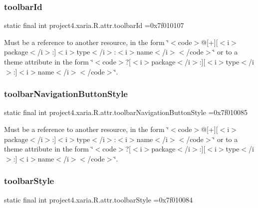 \subsubsection{\texorpdfstring{toolbar\+Id}{toolbarId}}
{\footnotesize\ttfamily static final int project4.\+xaria.\+R.\+attr.\+toolbar\+Id =0x7f010107\hspace{0.3cm}{\ttfamily [static]}}

Must be a reference to another resource, in the form \char`\"{}$<$code$>$@\mbox{[}+\mbox{]}\mbox{[}$<$i$>$package$<$/i$>$\+:\mbox{]}$<$i$>$type$<$/i$>$\+:$<$i$>$name$<$/i$>$$<$/code$>$\char`\"{} or to a theme attribute in the form \char`\"{}$<$code$>$?\mbox{[}$<$i$>$package$<$/i$>$\+:\mbox{]}\mbox{[}$<$i$>$type$<$/i$>$\+:\mbox{]}$<$i$>$name$<$/i$>$$<$/code$>$\char`\"{}. \mbox{\label{classproject4_1_1xaria_1_1R_1_1attr_a0dd7d3badd3c68b19ec4f38f6b65fc38}} 
\subsubsection{\texorpdfstring{toolbar\+Navigation\+Button\+Style}{toolbarNavigationButtonStyle}}
{\footnotesize\ttfamily static final int project4.\+xaria.\+R.\+attr.\+toolbar\+Navigation\+Button\+Style =0x7f010085\hspace{0.3cm}{\ttfamily [static]}}

Must be a reference to another resource, in the form \char`\"{}$<$code$>$@\mbox{[}+\mbox{]}\mbox{[}$<$i$>$package$<$/i$>$\+:\mbox{]}$<$i$>$type$<$/i$>$\+:$<$i$>$name$<$/i$>$$<$/code$>$\char`\"{} or to a theme attribute in the form \char`\"{}$<$code$>$?\mbox{[}$<$i$>$package$<$/i$>$\+:\mbox{]}\mbox{[}$<$i$>$type$<$/i$>$\+:\mbox{]}$<$i$>$name$<$/i$>$$<$/code$>$\char`\"{}. \mbox{\label{classproject4_1_1xaria_1_1R_1_1attr_a101d78018ae9b2eb12267e4c42a34b4a}} 
\subsubsection{\texorpdfstring{toolbar\+Style}{toolbarStyle}}
{\footnotesize\ttfamily static final int project4.\+xaria.\+R.\+attr.\+toolbar\+Style =0x7f010084\hspace{0.3cm}{\ttfamily [static]}}


